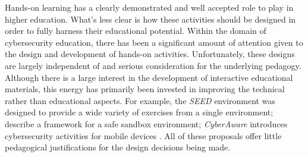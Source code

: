\providecommand{\heading}[1]{\section{#1}}
\providecommand{\subheading}[1]{\subsection{#1}}











Hands-on learning has a clearly demonstrated and well accepted role to play in higher education. What's less clear is how these activities should be designed in order to fully harness their educational potential. Within the domain of cybersecurity education, there has been a significant amount of attention given to the design and development of hands-on activities. Unfortunately, these designs are largely independent of and serious consideration for the underlying pedagogy. Although there is a large interest in the development of interactive educational materials, this energy has primarily been invested in improving the technical rather than educational aspects. For example, the \emph{SEED} \cite{W-Du} environment was designed to provide a wide variety of exercises from a single environment; \textcite{N-Eliot} describe a framework for a safe sandbox environment; \emph{CyberAware} introduces cybersecurity activities for mobile devices \cite{F-Giannakas}. All of these proposals offer little pedagogical justifications for the design decisions being made. 

